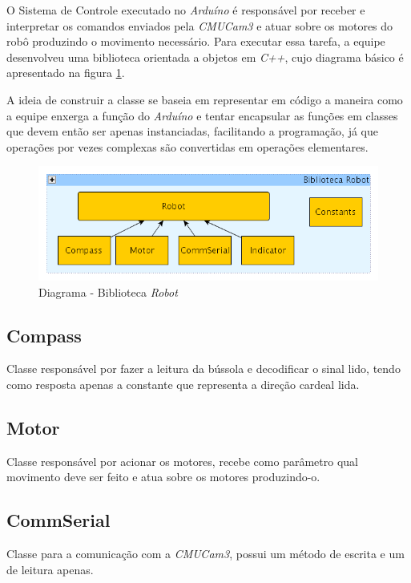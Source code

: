 O Sistema de Controle executado no \textit{Arduíno} é responsável por receber e interpretar os comandos enviados pela \textit{CMUCam3} e atuar sobre os motores do robô produzindo o movimento necessário. Para executar essa tarefa, a equipe desenvolveu uma biblioteca orientada a objetos em \textit{C++}, cujo diagrama básico é apresentado na figura \ref{int_fig03}.

A ideia de construir a classe se baseia em representar em código a maneira como a equipe enxerga a função do \textit{Arduíno} e tentar encapsular as funções em classes que devem então ser apenas instanciadas, facilitando a programação, já que operações por vezes complexas são convertidas em operações elementares.

\begin{figure}[htb!]
    \center
    \includegraphics[scale=0.5]{imagens/diagrama_classe_robot.png}
    \caption{Diagrama - Biblioteca \textit{Robot}}
    \label{int_fig03}
\end{figure}

\subsection{Compass}

Classe responsável por fazer a leitura da bússola e decodificar o sinal lido, tendo como resposta apenas a constante que representa a direção cardeal lida.

\subsection{Motor}

Classe responsável por acionar os motores, recebe como parâmetro qual movimento deve ser feito e atua sobre os motores produzindo-o.

\subsection{CommSerial}

Classe para a comunicação com a \textit{CMUCam3}, possui um método de escrita e um de leitura apenas.

